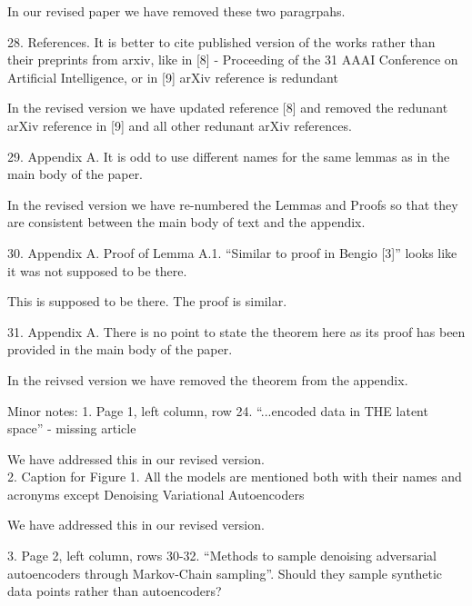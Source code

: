 \documentclass{article}
\begin{document}
In our revised paper we have removed these two paragrpahs.

{\color{blue}
28. References. It is better to cite published version of the works rather than their preprints from arxiv, like in [8] - Proceeding of the 31 AAAI Conference on Artificial Intelligence, or in [9] arXiv reference is redundant\\
}

{\color{red} In the revised version we have updated reference [8] and removed the redunant arXiv reference in [9] and all other redunant arXiv references.\\}

{\color{blue}
29. Appendix A. It is odd to use different names for the same lemmas as in the main body of the paper.\\
}

{\color{red} In the revised version we have re-numbered the Lemmas and Proofs so that they are consistent between the main body of text and the appendix.\\}

{\color{blue}
30. Appendix A. Proof of Lemma A.1. ``Similar to proof in Bengio [3]'' looks like it was not supposed to be there.\\
}

{\color{red} This is supposed to be there. The proof is similar.\\}

{\color{blue}
31. Appendix A. There is no point to state the theorem here as its proof has been provided in the main body of the paper. \\
}

{\color{red} In the reivsed version we have removed the theorem from the appendix.\\}

{\color{blue}
Minor notes:
1. Page 1, left column, row 24. ``...encoded data in THE latent space'' - missing article\\
}

We have addressed this in our revised version.\\ 

{\color{blue}
2. Caption for Figure 1. All the models are mentioned both with their names and acronyms except Denoising Variational Autoencoders
}

We have addressed this in our revised version.

{\color{blue}
3. Page 2, left column, rows 30-32. ``Methods to sample denoising adversarial autoencoders through Markov-Chain sampling''. Should they sample synthetic data points rather than autoencoders?
}
\end{document}
